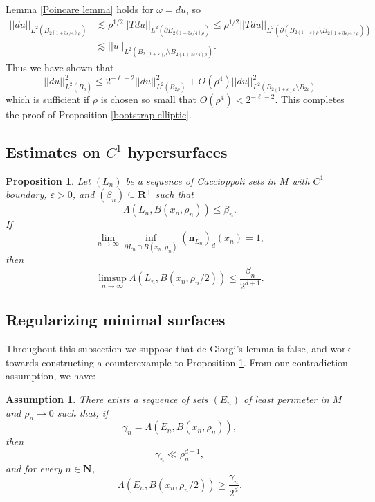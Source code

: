 \documentclass[reqno,12pt,letterpaper]{amsart}
\newcommand{\NN}{\mathbf{N}}
\newcommand{\RR}{\mathbf{R}}
\newcommand{\normal}{\mathbf n}
\newtheorem{proposition}[theorem]{Proposition}
\newtheorem{assumption}[theorem]{Assumption}
\theoremstyle{definition}
\numberwithin{equation}{section}
\begin{document}
Lemma \ref{Poincare lemma} holds for $\omega = du$, so
\begin{align*}
||du||_{L^2(B_{2(1 + 3\varepsilon/4)\rho})} &\lesssim \rho^{1/2} ||Tdu||_{L^2(\partial B_{2(1 + 3\varepsilon/4)\rho})}
 \leq \rho^{1/2} ||Tdu||_{L^2(\partial(B_{2(1 + \varepsilon)\rho} \setminus B_{2(1 + 3\varepsilon/4)\rho}))} \\
&\lesssim ||u||_{L^2(B_{2(1 + \varepsilon)\rho} \setminus B_{2(1 + 3\varepsilon/4)\rho})}.
\end{align*}
Thus we have shown that
$$||du||_{L^2(B_\rho)}^2 \leq 2^{-\ell-2}||du||_{L^2(B_{2\rho})}^2 + O(\rho^4) ||du||_{L^2(B_{2(1 + \varepsilon)\rho} \setminus B_{2\rho})}^2$$
which is sufficient if $\rho$ is chosen so small that $O(\rho^4) < 2^{-\ell-2}$.
This completes the proof of Proposition \ref{bootstrap elliptic}.

\subsection{Estimates on $C^1$ hypersurfaces}
\begin{proposition}
\label{bootstrap C1}
Let $(L_n)$ be a sequence of Caccioppoli sets in $M$ with $C^1$ boundary, $\varepsilon > 0$, and $(\beta_n) \subseteq \RR^+$ such that
$$\Lambda(L_n, B(x_n, \rho_n)) \leq \beta_n.$$
If
$$\lim_{n \to \infty} \inf_{\partial L_n \cap B(x_n, \rho_n)} (\normal_{L_n})_d(x_n) = 1,$$
then
$$\limsup_{n \to \infty} \Lambda(L_n, B(x_n, \rho_n/2)) \leq \frac{\beta_n}{2^{d + 1}}.$$
\end{proposition}

\subsection{Regularizing minimal surfaces}
Throughout this subsection we suppose that de Giorgi's lemma is false, and work towards constructing a counterexample to Proposition \ref{bootstrap C1}.
From our contradiction assumption, we have:

\begin{assumption} \label{contradict DGL}
There exists a sequence of sets $(E_n)$ of least perimeter in $M$ and $\rho_n \to 0$ such that, if
$$\gamma_n = \Lambda(E_n, B(x_n, \rho_n)),$$
then
\begin{equation}\label{contradict DGL bootstrap}
\gamma_n \ll \rho_n^{d - 1},
\end{equation}
and for every $n \in \NN$,
\begin{equation}\label{contradict DGL eqn}
\Lambda(E_n, B(x_n, \rho_n/2)) \geq \frac{\gamma_n}{2^d}.
\end{equation}
\end{assumption}
\end{document}
